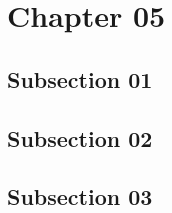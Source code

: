 \section{Chapter 05}
\subsection{Subsection 01}
\lipsum[1-5]
\subsection{Subsection 02}
\lipsum[1-5]
\subsection{Subsection 03}
\lipsum[1-5]
